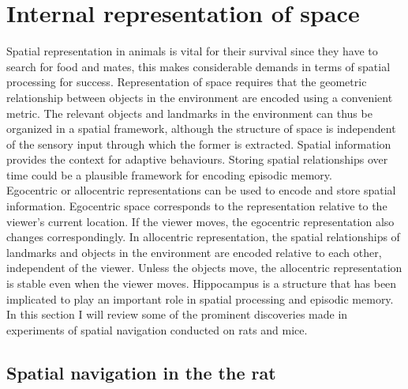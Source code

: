 
\section{Internal representation of space} %

\label{space} 


Spatial representation in animals is vital for their survival since they have to search for food and mates, this makes considerable demands in terms of spatial processing for success. Representation of space requires that the geometric relationship between objects in the environment are encoded using a convenient metric. The relevant objects and landmarks in the environment can thus be organized in a spatial framework, although the structure of space is independent of the sensory input through which the former is extracted. Spatial information provides the context for adaptive behaviours. Storing spatial relationships over time could be a plausible framework for encoding episodic memory. \\
Egocentric or allocentric representations can be used to encode and store spatial information. Egocentric space corresponds to the representation relative to the viewer's current location. If the viewer moves, the egocentric representation also changes correspondingly. In allocentric representation, the spatial relationships of landmarks and objects in the environment are encoded relative to each other, independent of the viewer. Unless the objects move, the allocentric representation is stable even when the viewer moves. Hippocampus is a structure that has been implicated to play an important role in spatial processing and episodic memory. In this section I will review some of the prominent discoveries made in experiments of spatial navigation conducted on rats and mice.

\subsection{Spatial navigation in the the rat}

